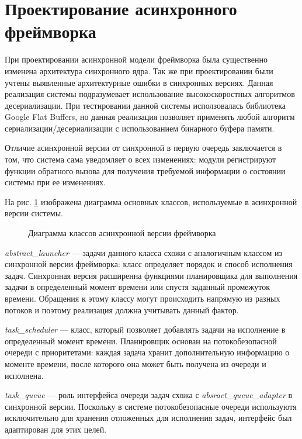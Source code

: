 \section{Проектирование асинхронного фреймворка}

При проектировании асинхронной модели фреймворка была существенно изменена 
архитектура синхронного ядра. Так же при проектировании были учтены выявленные 
архитектурные ошибки в синхронных версиях. Данная реализация системы 
подразумевает использование высокоскоростных алгоритмов десериализации. При 
тестировании данной системы исползовалась библиотека Google Flat Buffers, но 
данная реализация позволяет применять любой алгоритм 
сериализации/десериализации с использованием бинарного буфера памяти.

Отличие асинхронной версии от синхронной в первую очередь заключается в том, что система сама уведомляет о всех изменениях: модули регистрируют функции обратного вызова для получения требуемой информации о состоянии системы при ее изменениях.

На рис. \ref{im:2_3_1_async} изображена диаграмма основных классов, используемые в асинхронной версии системы.

\begin{figure}[h]
    \caption{Диаграмма классов асинхронной версии фреймворка}
    \label{im:2_3_1_async}
\end{figure}

\textit{abstract\_launcher} --- задачи данного класса схожи с аналогичным классом из синхронной версии фреймворка: класс определяет порядок и способ исполнения задач. Синхронная версия расширенна функциями планировщика для выполнения задачи в определенный момент времени или спустя заданный промежуток времени. Обращения к этому классу могут происходить напрямую из разных потоков и поэтому реализация должна учитывать данный фактор.

\textit{task\_scheduler} --- класс, который позволяет добавлять задачи на исполнение в определенный момент времени. Планировщик основан на потокобезопасной очереди с приоритетами: каждая задача хранит дополнительную информацию о моменте времени, после которого она может быть получена из очереди и исполнена.

\textit{task\_queue} --- роль интерфейса очереди задач схожа с \textit{absract\_queue\_adapter} в синхронной версии. Поскольку в системе потокобезопасные очереди используютя исключительно для хранения отложенных для исполнения задач, интерфейс был адаптирован для этих целей.

